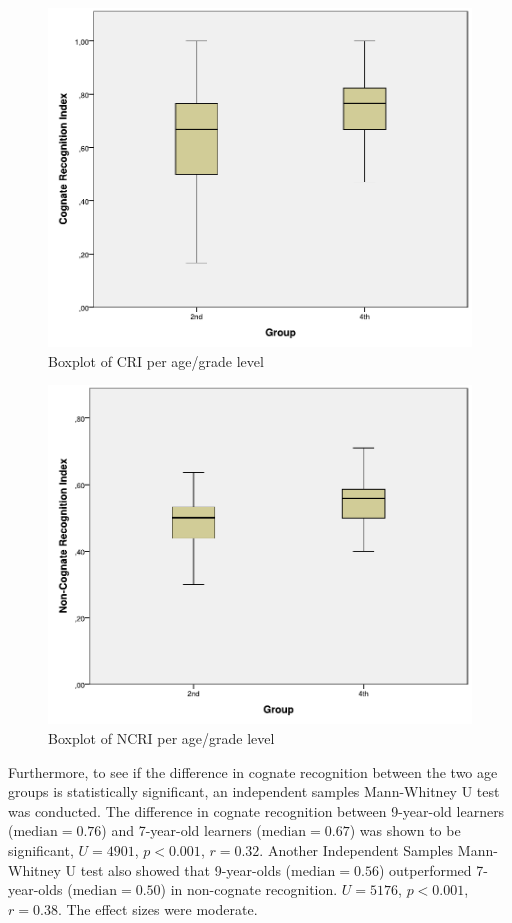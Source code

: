 \documentclass[output=paper,modfonts,nonflat,newtxmath]{langsci/langscibook}
\begin{document}
\begin{figure}[p]
\includegraphics[width=.75\textwidth]{figures/CRI.pdf}%
\caption{\label{fig:munoz:1}Boxplot of CRI per age/grade level}
\end{figure}

\begin{figure}[p]
\caption{\label{fig:munoz:2}Boxplot of NCRI per age/grade level}
\includegraphics[width=.75\textwidth]{figures/NCRI.pdf}%
\end{figure}

Furthermore, to see if the difference in cognate recognition between the two age groups is statistically significant, an independent samples Mann-Whitney U test was conducted. The difference in cognate recognition between 9-year-old learners ($\text{median} = 0.76$) and 7-year-old learners ($\text{median} = 0.67$) was shown to be significant, $U = 4901$, $p < 0.001$, $r = 0.32$.  Another Independent Samples Mann-Whitney U test also showed that 9-year-olds ($\text{median} = 0.56$) outperformed 7-year-olds ($\text{median} = 0.50$) in non-cognate recognition. $U = 5176$, $p < 0.001$, $r = 0.38$. The effect sizes were moderate.
\end{document}
